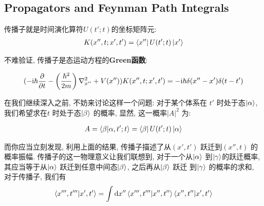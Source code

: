 \subsection{Propagators and Feynman Path Integrals}

\begin{definition}[传播子]
  传播子就是时间演化算符$U(t'; t)$的坐标矩阵元:
  \begin{equation}
    \begin{aligned}
      K(x'', t; x', t') = \bra{x''} U(t'; t) \ket{x'}
    \end{aligned}
  \end{equation}
\end{definition}

不难验证, 传播子是态运动方程的{\bf Green函数}:

\begin{equation}
  \begin{aligned}
    (- {\rm i} \hbar \pdv{}{t} - \left(\frac{\hbar^{2}}{2m}\right)\nabla_{x''}^{2} + V(x''))K(x'', t; x', t') = - {\rm i} \hbar \delta(x''-x') \delta(t-t')
  \end{aligned}
\end{equation}

在我们继续深入之前, 不妨来讨论这样一个问题: 对于某个体系在 $t'$ 时处于态$\ket{\alpha}$,
我们希望求在$t$ 时处于态$\ket{\beta}$ 的概率, 显然, 这一概率$|A|^{2}$ 为:

\begin{equation}
  \begin{aligned}
    A = \bra{\beta}\ket{\alpha, t';t} = \bra{\beta}U(t'; t) \ket{\alpha}
  \end{aligned}
\end{equation}

而你应当立刻发现, 利用上面的结果, 传播子描述了从$(x', t')$ 跃迁到$(x'', t)$ 的概率振幅.
传播子的这一物理意义让我们联想到, 对于一个从$\ket{\alpha}$ 到$\ket{\gamma}$的跃迁概率,
其应当等于从$\ket{\alpha}$ 跃迁到任意中间态$\ket{\beta}$, 之后再从$\ket{\beta}$ 跃迁
到$\ket{\gamma}$ 的概率的求和, 对于传播子, 我们有
\begin{equation}
  \begin{aligned}
    \bra{x''', t'''}\ket{x', t'} = \int \dd x'' \bra{x''', t'''}\ket{x'', t''}\bra{x'', t''} \ket{x', t'}
  \end{aligned}
\end{equation}


